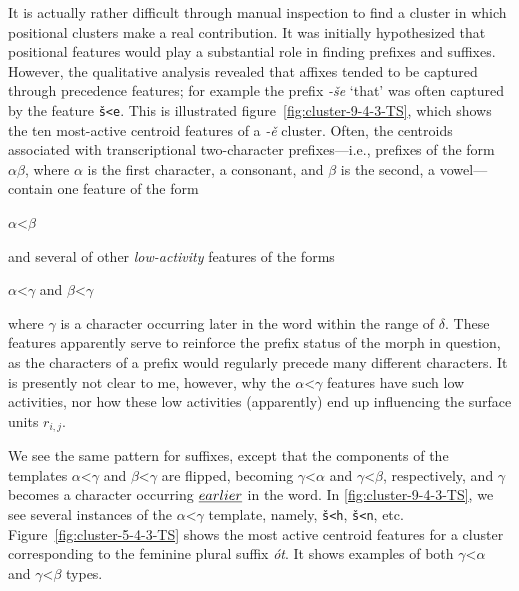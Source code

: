 It is actually rather difficult through manual inspection to find a cluster in which positional clusters make a real contribution. 
It was initially hypothesized that positional features would play a substantial role in
finding prefixes and suffixes. However, the qualitative analysis revealed that affixes tended to be captured through 
precedence features; for example the prefix \textit{-\v{s}e} `that'  was often captured by the feature \texttt{\v{s}<e}. This is illustrated figure~\ref{fig:cluster-9-4-3-TS}, which shows the ten most-active centroid features of a \textit{-\v{e}} cluster.
 Often, the centroids associated with transcriptional two-character prefixes---i.e., prefixes of the form
$\alpha\beta$,
where $\alpha$ is the first character, a consonant, and $\beta$ is the second, a vowel---
contain one feature of the form 
\begin{center}
$\alpha$<$\beta$ 
\end{center}
and several of other \emph{low-activity} features
of the forms 
\begin{center}
$\alpha$<$\gamma$ \quad and \quad $\beta$<$\gamma$  
\end{center}
where $\gamma$ is a character occurring later in the word within the range of $\delta$. These features apparently serve to reinforce the prefix status of the morph in question, as the characters of a prefix would regularly precede many different characters. It is presently not clear to me, however, why the $\alpha$<$\gamma$ features have such low activities, nor how these low activities (apparently) end up influencing the surface units $r_{i,j}$.

We see the same pattern for suffixes, except that the components of the templates $\alpha$<$\gamma$ and $\beta$<$\gamma$ are flipped, becoming $\gamma$<$\alpha$ and $\gamma$<$\beta$, respectively, and $\gamma$ becomes a character occurring $\emph{earlier}$ in the word. In \ref{fig:cluster-9-4-3-TS}, we see several instances of the $\alpha$<$\gamma$ template, namely, \texttt{\v{s}<h}, \texttt{\v{s}<n}, etc. Figure~\ref{fig:cluster-5-4-3-TS} shows the most active centroid features for a cluster corresponding to the feminine plural suffix \textit{\'{o}t}. It shows examples of both $\gamma$<$\alpha$ and $\gamma$<$\beta$ types.

